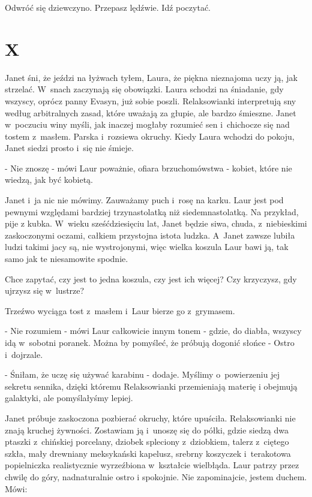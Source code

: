 \documentclass[oneside,polish,12pt,sfheadings]{mwbk}
\begin{document}
Odwróć się dziewczyno. Przepasz lędźwie. Idź poczytać.

\chapter{X}

Janet śni, że jeździ na łyżwach tyłem, Laura, że piękna nieznajoma
uczy ją, jak strzelać. W~snach zaczynają się obowiązki. Laura schodzi
na śniadanie, gdy wszyscy, oprócz panny Evasyn, już sobie poszli. Relaksowianki
interpretują sny według arbitralnych zasad, które uważają za głupie,
ale bardzo śmieszne. Janet w~poczuciu winy myśli, jak inaczej mogłaby
rozumieć sen i~chichocze się nad tostem z~masłem. Parska i~rozsiewa
okruchy. Kiedy Laura wchodzi do pokoju, Janet siedzi prosto i~się
nie śmieje. 

- Nie znoszę - mówi Laur poważnie, ofiara brzuchomówstwa
- kobiet, które nie wiedzą, jak być kobietą. 

Janet i~ja nic nie
mówimy. Zauważamy puch i~rosę na karku. Laur jest pod pewnymi względami
bardziej trzynastolatką niż siedemnastolatką. Na przykład, pije z
kubka. W~wieku sześćdziesięciu lat, Janet będzie siwa, chuda, z~niebieskimi
zaskoczonymi oczami, całkiem przystojna istota ludzka. A~Janet zawsze
lubiła ludzi takimi jacy są, nie wystrojonymi, więc wielka koszula
Laur bawi ją, tak samo jak te niesamowite spodnie.

Chce zapytać, czy jest to jedna koszula, czy jest ich więcej? Czy
krzyczysz, gdy ujrzysz się w~lustrze?

Trzeźwo wyciąga tost z~masłem i~Laur bierze go z~grymasem.

- Nie rozumiem - mówi Laur całkowicie innym tonem - gdzie, do diabła,
wszyscy idą w~sobotni poranek. Można by pomyśleć, że próbują dogonić
słońce - Ostro i~dojrzale.

- Śniłam, że uczę się używać karabinu - dodaje. Myślimy o~powierzeniu
jej sekretu sennika, dzięki któremu Relaksowianki przemieniają materię
i obejmują galaktyki, ale pomyślałyśmy lepiej.

Janet próbuje zaskoczona pozbierać okruchy, które upuściła. Relaksowianki
nie znają kruchej żywności. Zostawiam ją i~unoszę się do półki, gdzie
siedzą dwa ptaszki z~chińskiej porcelany, dziobek spleciony z~dziobkiem,
talerz z~ciętego szkła, mały drewniany meksykański kapelusz, srebrny
koszyczek i~terakotowa popielniczka realistycznie wyrzeźbiona w~kształcie
wielbłąda. Laur patrzy przez chwilę do góry, nadnaturalnie ostro i
spokojnie. Nie zapominajcie, jestem duchem. Mówi: 
\end{document}
